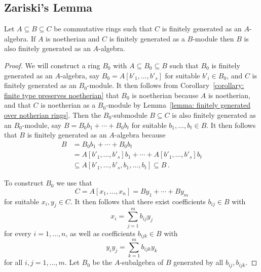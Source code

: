 \subsection{Zariski’s Lemma}
\label{subsection: Zariskis lemma}


\begin{lemma}
  \label{lemma: technical ring lemma}
  Let $A \subseteq B \subseteq C$ be commutative rings such that $C$ is finitely generated as an $A$-algebra.
  If  $A$ is noetherian and $C$ is finitely generated as a $B$-module then $B$ is also finitely generated as an $A$-algebra.
\end{lemma}


\begin{proof}
  We will construct a ring $B_0$ with $A \subseteq B_0 \subseteq B$ such that $B_0$ is finitely generated as an $A$-algebra, say $B_0 = A[b'_1, \dotsc, b'_s]$ for suitable $b'_i \in B_0$, and $C$ is finitely generated as an $B_0$-module.
  It then follows from Corollary~\ref{corollary: finite type preserves noetherian} that $B_0$ is noetherian because $A$ is noetherian, and that $C$ is noetherian as a $B_0$-module by Lemma~\ref{lemma: finitely generated over notherian rings}.
  Then the $B_0$-submodule $B \subseteq C$ is also finitely generated as an $B_0$-module, say $B = B_0 b_1 + \dotsb + B_0 b_t$ for suitable $b_1, \dotsc, b_t \in B$.
  It then follows that $B$ is finitely generated as an $A$-algebra because
  \begin{align*}
                B
    &=          B_0 b_1 + \dotsb + B_0 b_t  \\
    &=          A[b'_1, \dotsc, b'_s] b_1 + \dotsb + A[b'_1, \dotsc, b'_s] b_t  \\
    &\subseteq  A[b'_1, \dotsc, b'_s, b_1, \dotsc, b_t]
     \subseteq  B \,.
  \end{align*}
  
  To construct $B_0$ we use that
  \[
      C
    = A[x_1, \dotsc, x_n]
    = B y_1 + \dotsb + B y_m
  \]
  for suitable $x_i, y_j \in C$.
  It then follows that there exist coefficients $b_{ij} \in B$ with
  \[
      x_i
    = \sum_{j=1}^m b_{ij} y_j
  \]
  for every $i = 1, \dotsc, n$, as well as coefficients $b_{ijk} \in B$ with
  \[
      y_i y_j
    = \sum_{k=1}^m b_{ijk} y_k
  \]
  for all $i,j = 1, \dotsc, m$.
  Let $B_0$ be the $A$-subalgebra of $B$ generated by all $b_{ij}, b_{ijk}$.
  

\end{proof}
